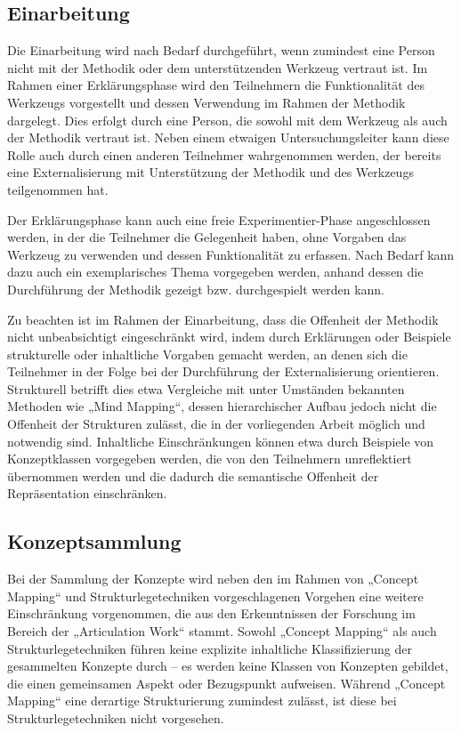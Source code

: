 \subsection{Einarbeitung}

Die Einarbeitung wird nach Bedarf durchgeführt, wenn zumindest eine Person nicht mit der Methodik oder dem unterstützenden Werkzeug vertraut ist. Im Rahmen einer Erklärungsphase wird den Teilnehmern die Funktionalität des Werkzeugs vorgestellt und dessen Verwendung im Rahmen der Methodik dargelegt. Dies erfolgt durch eine Person, die sowohl mit dem Werkzeug als auch der Methodik vertraut ist. Neben einem etwaigen Untersuchungsleiter kann diese Rolle auch durch einen anderen Teilnehmer wahrgenommen werden, der bereits eine Externalisierung mit Unterstützung der Methodik und des Werkzeugs teilgenommen hat.

Der Erklärungsphase kann auch eine freie Experimentier-Phase angeschlossen werden, in der die Teilnehmer die Gelegenheit haben, ohne Vorgaben das Werkzeug zu verwenden und dessen Funktionalität zu erfassen. Nach Bedarf kann dazu auch ein exemplarisches Thema vorgegeben werden, anhand dessen die Durchführung der Methodik gezeigt bzw. durchgespielt werden kann.

Zu beachten ist im Rahmen der Einarbeitung, dass die Offenheit der Methodik nicht unbeabsichtigt eingeschränkt wird, indem durch Erklärungen oder Beispiele strukturelle oder inhaltliche Vorgaben gemacht werden, an denen sich die Teilnehmer in der Folge bei der Durchführung der Externalisierung orientieren. Strukturell betrifft dies etwa Vergleiche mit unter Umständen bekannten Methoden wie „Mind Mapping“, dessen hierarchischer Aufbau jedoch nicht die Offenheit der Strukturen zulässt, die in der vorliegenden Arbeit möglich und notwendig sind. Inhaltliche Einschränkungen können etwa durch Beispiele von Konzeptklassen vorgegeben werden, die von den Teilnehmern unreflektiert übernommen werden und die dadurch die semantische Offenheit der Repräsentation einschränken.

\subsection{Konzeptsammlung}

Bei der Sammlung der Konzepte wird neben den im Rahmen von „Concept Mapping“ und Strukturlegetechniken vorgeschlagenen Vorgehen eine weitere Einschränkung vorgenommen, die aus den Erkenntnissen der Forschung im Bereich der „Articulation Work“ stammt. Sowohl „Concept Mapping“ als auch Strukturlegetechniken führen keine explizite inhaltliche Klassifizierung der gesammelten Konzepte durch -- es werden keine Klassen von Konzepten gebildet, die einen gemeinsamen Aspekt oder Bezugspunkt aufweisen. Während „Concept Mapping“ eine derartige Strukturierung zumindest zulässt, ist diese bei Strukturlegetechniken nicht vorgesehen.

